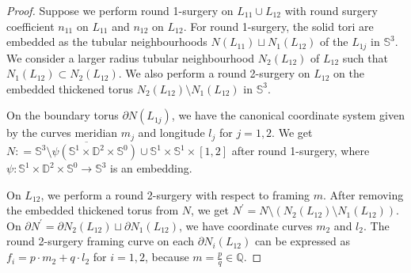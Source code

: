 \documentclass{amsart}
\theoremstyle{plain}
\theoremstyle{remark}
\theoremstyle{definition}
\newcommand{\s}{\mathbb{S}}
\newcommand{\D}{\mathbb{D}}
\newcommand{\dd}{\partial}
\begin{document}
\begin{proof}
Suppose we perform round 1-surgery on $L_{11} \cup L_{12}$ with round surgery coefficient $n_{11}$ on $L_{11}$ and $n_{12}$ on $L_{12}$. 
For round 1-surgery, the solid tori are embedded as the tubular neighbourhoods $N(L_{11}) \sqcup N_1(L_{12})$ of the $L_{1j}$ in $\s^3$. 
We consider a larger radius tubular neighbourhood $N_2(L_{12})$ of $L_{12}$ such that $N_1 (L_{12}) \subset N_2(L_{12})$. 
We also perform a round 2-surgery on $L_{12}$ on the embedded thickened torus $N_2(L_{12}) \setminus N_1 (L_{12})$ in $\s^3$.

On the boundary torus $\partial N(L_{1j})$, we have the canonical coordinate system given by the curves meridian $m_j$ and longitude $l_{j}$ for $j=1,2$. 
We get $N: = \overline{\s^3\setminus \psi(\s^1\times \D^2\times \s^0)} \cup \s^1 \times \s^1 \times [1,2]$ after round 1-surgery, where $\psi : \s^1 \times \D^2 \times  \s^0 \to \s^3$ is an embedding.
   
On $L_{12}$, we perform a round 2-surgery with respect to framing $m$.
After removing the embedded thickened torus from $N$, we get $N^{\prime}= N\setminus (N_2 (L_{12}) \setminus N_1 (L_{12}))$. 
On $\partial N^{\prime} =\dd N_2 (L_{12}) \sqcup \dd N_1 (L_{12})$, we have coordinate curves $m_{2}$ and $l_{2}$. 
The round 2-surgery framing curve on each $\dd N_i (L_{12})$ can be expressed as $f_i= p\cdot m_{2} + q \cdot l_{2}$ for $i=1,2$, because $m = \frac{p}{q} \in \mathbb{Q}$. 


\end{proof}
\end{document}
